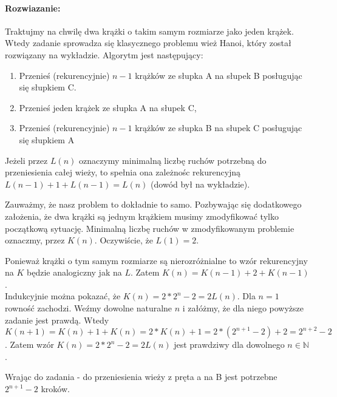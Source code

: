 \documentclass{article}
\newenvironment{rozw}{\paragraph{Rozwiazanie:}}{\hfill}
\begin{document}
\begin{rozw}

Traktujmy na chwilę dwa krążki o takim samym rozmiarze jako jeden krążek. Wtedy zadanie sprowadza się klasycznego problemu wież Hanoi, który został rozwiązany na wykładzie. Algorytm jest następujący:

\begin{enumerate}
\item Przenieś (rekurencyjnie) $n-1$ krążków ze słupka A na słupek B posługując się słupkiem C.
\item Przenieś jeden krążek ze słupka A na słupek C,
\item Przenieś (rekurencyjnie) $n-1$ krążków ze słupka B na słupek C posługując się słupkiem A
\end{enumerate}

Jeżeli przez $L(n)$ oznaczymy minimalną liczbę ruchów potrzebną do przeniesienia całej wieży, to spełnia ona zależnośc rekurencyjną $L(n-1) + 1 + L(n-1) = L(n)$ (dowód był na wykładzie). 

Zauważmy, że nasz problem to dokładnie to samo. Pozbywając się dodatkowego założenia, że dwa krążki są jednym krążkiem musimy zmodyfikować tylko początkową sytuację.
Minimalną liczbę ruchów w zmodyfikowanym problemie oznaczmy, przez $K(n)$. Oczywiście, że $L(1) = 2$.

Ponieważ krążki o tym samym rozmiarze są nierozróżnialne to wzór rekurencyjny na $K$ będzie analogiczny jak na $L$.
Zatem $K(n) = K(n-1) + 2 + K(n-1)$.\\

Indukcyjnie można pokazać, że $K(n) = 2*2^n - 2 = 2L(n)$. Dla $n = 1$ rowność zachodzi. Weźmy dowolne naturalne $n$ i załóżmy, że dla niego powyższe zadanie jest prawdą. Wtedy $K(n+1) = K(n) + 1 + K(n) = 2*K(n) + 1 = 2*(2^{n+1} - 2) + 2 = 2^{n+2} - 2$. Zatem wzór $K(n) = 2*2^n - 2 = 2L(n)$ jest prawdziwy dla dowolnego $n \in \mathbb{N}$.

Wrając do zadania - do przeniesienia wieży z pręta a na B jest potrzebne $2^{n+1} - 2$ kroków.

\end{rozw}



\end{document}
